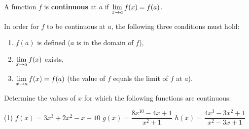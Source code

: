 \documentclass[../mathNotesPreamble]{subfiles}
\begin{document}
  \begin{defn*}
    A function $f$ is \textbf{continuous} at $a$ if $\displaystyle\lim_{x \to a}f(x)=f(a)$.
  \end{defn*}

  \begin{thmBox*}
    In order for $f$ to be continuous at $a$, the following three conditions must hold:
    \begin{enumerate}
      \item $f(a)$ is defined ($a$ is in the domain of $f$),
      \item $\displaystyle\lim_{x \to a} f(x)$ exists,
      \item $\displaystyle\lim_{x \to a} f(x)=f(a)$ (the value of $f$ equals the limit of $f$ at $a$).
    \end{enumerate}
  \end{thmBox*}
  \begin{ex*}
    Determine the values of $x$ for which the following functions are continuous:
  \end{ex*}
  \begin{extasks}[after-item-skip=\stretch{1}](1)
    \task $f(x)=3x^3+2x^2-x+10$
    \task $g(x)=\dfrac{8x^{10}-4x+1}{x^2+1}$
    \task $h(x)=\dfrac{4x^3-3x^2+1}{x^2-3x+1}$
  \end{extasks}
  \pagebreak
\end{document}
